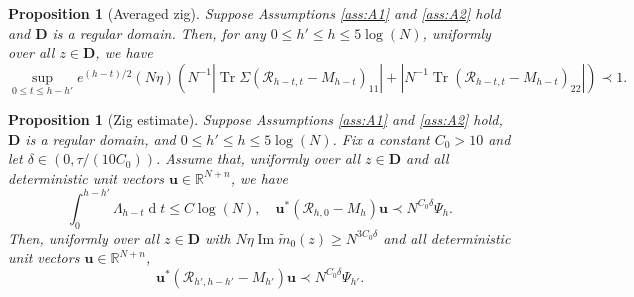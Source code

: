 \documentclass[11pt,reqno]{amsart}
\def\R{\mathbb{R}}
\def\u{\mathbf{u}}
\def\cR{\mathcal{R}}
\def\bD{\mathbf{D}}
\def\de{\operatorname{d}}
\def\Im{\operatorname{Im}}
\def\Tr{\operatorname{Tr}}
\newtheorem{proposition}[theorem]{Proposition}
\theoremstyle{definition}
\numberwithin{equation}{section}
\numberwithin{figure}{section}
\begin{document}
\begin{proposition}[Averaged zig]\label{prop:averaged zig}
Suppose Assumptions \ref{ass:A1} and \ref{ass:A2} hold and $\bD$ is a regular domain. Then, for any $0\leq h'\leq h\leq 5\log(N)$, uniformly over all $z\in\bD$, we have
\[
    \sup_{0\leq t\leq h-h'}e^{(h-t)/2}(N\eta)(N^{-1}|\Tr\Sigma(\cR_{h-t,t}-M_{h-t})_{11}|
    +|N^{-1}\Tr(\cR_{h-t,t}-M_{h-t})_{22}|)\prec 1.
\]
\end{proposition}

\begin{proposition}[Zig estimate]
\label{prop:full-block-zig}
Suppose Assumptions \ref{ass:A1} and \ref{ass:A2} hold, $\bD$ is a regular domain, and $0\leq h'\leq h\leq 5\log(N)$. Fix a constant $C_0>10$ and let $\delta\in(0,\tau/(10C_0))$. Assume that, uniformly over all $z\in\bD$ and all deterministic unit vectors $\u\in\R^{N+n}$, we have
\[
    \int_0^{h-h'}\Lambda_{h-t}\de t\leq C\log(N),
    \quad \u^*(\cR_{h,0}-M_h)\u\prec N^{C_0\delta}\Psi_h.
\]
Then, uniformly over all $z\in\bD$ with $N\eta\Im\widetilde m_0(z)\geq N^{3C_0\delta}$ and all deterministic unit vectors $\u\in\R^{N+n}$,
\[
    \u^*(\cR_{h',h-h'}-M_{h'})\u\prec N^{C_0\delta}\Psi_{h'}.
\]
\end{proposition}
\end{document}
